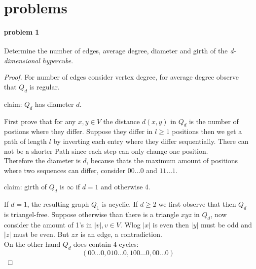 \section{problems}

\paragraph{problem 1}
Determine the number of edges, average degree, diameter and girth of the 
\textit{d-dimensional hypercube}.
\begin{proof}
    For number of edges consider vertex degree, for average degree observe that 
    $ Q_d $ is regular.

    \bigskip
    \noindent claim: $ Q_d $ has diameter $ d $.

    \smallskip
    \noindent First prove that for any $x,y \in V$ the distance $d(x,y)$ in 
    $Q_d$ is the number of postions where they differ.
    Suppose they differ in $l \geq 1$ 
    positions then we get a path of length $ l $ by inverting each entry where
    they differ sequentially. There can not be a shorter Path since each step 
    can only change one position. \\
    Therefore the diameter is $d$, because thats the maximum amount of positions 
    where two sequences can differ, consider $ 00...0 $ and $ 11...1 $.

    \bigskip
    \noindent claim: girth of $Q_d$ is $ \infty $ if $ d = 1 $ and otherwise 4.

    \smallskip
    \noindent
    If $ d = 1 $, the resulting graph $Q_1$ is acyclic. If $d \geq 2$ we first 
    observe that then $ Q_d $ is triangel-free. Suppose otherwise than there is 
    a triangle $xyz$ in $ Q_d $, now consider the amount of 1's in $|v|,v\in V$.
    Wlog $ |x| $ is even then $ |y| $ must be odd and $ |z| $ must be even.
    But $ zx $ is an edge, a contradiction. \\
    On the other hand $ Q_d $ does contain 4-cycles:
    $$ (00...0, 010...0, 100...0, 00...0)$$
\end{proof}

